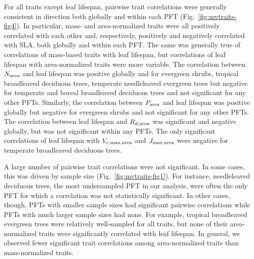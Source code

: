 For all traits except leaf lifespan, pairwise trait correlations were generally consistent in direction both globally and within each PFT (Fig.~\ref{fig:mvtraits-fig4}).
In particular, mass- and area-normalized traits were all positively correlated with each other and, respectively, positively and negatively correlated with SLA, both globally and within each PFT\@.
The same was generally true of correlations of mass-based traits with leaf lifespan, but correlations of leaf lifespan with area-normalized traits were more variable.
The correlation between $N_{\text{area}}$ and leaf lifespan was positive globally and for evergreen shrubs, tropical broadleaved deciduous trees, temperate needleleaved evergreen trees but negative for temperate and boreal broadleaved deciduous trees and not significant for any other PFTs.
Similarly, the correlation between $P_{\text{area}}$ and leaf lifespan was positive globally but negative for evergreen shrubs and not significant for any other PFTs.
The correlation between leaf lifespan and $R_{d,\text{area}}$ was significant and negative globally, but was not significant within any PFTs.
The only significant correlations of leaf lifespan with $V_{c,\max,\text{area}}$ and $J_{\max,\text{area}}$ were negative for temperate broadleaved deciduous trees.

A large number of pairwise trait correlations were not significant.
In some cases, this was driven by sample size (Fig.~\ref{fig:mvtraits-fig1}).
For instance, needleleaved deciduous trees, the most undersampled PFT in our analysis, were often the only PFT for which a correlation was not statistically significant.
In other cases, though, PFTs with smaller sample sizes had significant pairwise correlations while PFTs with much larger sample sizes had none.
For example, tropical broadleaved evergreen trees were relatively well-sampled for all traits, but none of their area-normalized traits were significantly correlated with leaf lifespan.
In general, we observed fewer significant trait correlations among area-normalized traits than mass-normalized traits. 

